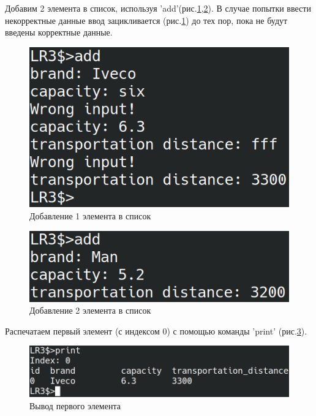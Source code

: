 Добавим 2 элемента в список, используя 'add'(рис.\ref{test.add},\ref{test.add2}).
В случае попытки ввести некорректные данные 
ввод зацикливается (рис.\ref{test.add}) до тех пор,
пока не будут введены корректные данные.

\begin{figure}[H]
    \centering
    \includegraphics[width=0.9\linewidth]{photo/test.add}
    \caption{Добавление 1 элемента в список}
    \label{test.add}
\end{figure}

\begin{figure}[H]
    \centering
    \includegraphics[width=0.9\linewidth]{photo/test.add2}
    \caption{Добавление 2 элемента в список}
    \label{test.add2}
\end{figure}

Распечатаем первый элемент (с индексом 0) с помощью команды 'print' (рис.\ref{test.print0}).

\begin{figure}[hpt!]
    \centering
    \includegraphics[width=0.9\linewidth]{photo/test.print0}
    \caption{Вывод первого элемента}
    \label{test.print0}
\end{figure}

